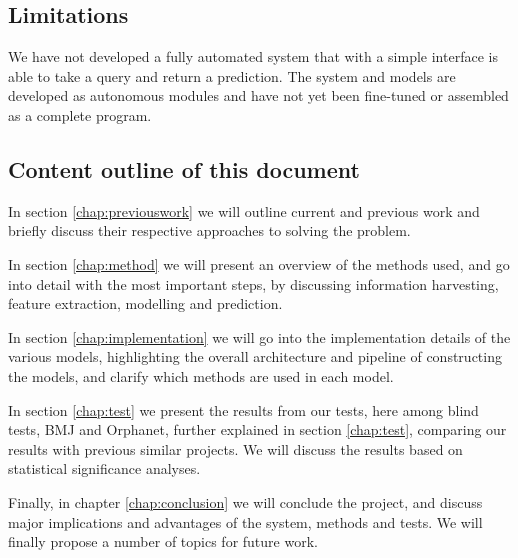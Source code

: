 \documentclass[10pt,letterpaper,final]{article}
\begin{document}



\subsection{Limitations}
We have not developed a fully automated system that with a simple
interface is able to take a query and return a prediction. The system
and models are developed as autonomous modules and have not yet been
fine-tuned or assembled as a complete program.


\subsection{Content outline of this document}
In section \ref{chap:previouswork} we will outline current and previous
work and briefly discuss their respective approaches to solving the
problem.

In section \ref{chap:method} we will present an overview of the methods
used, and go into detail with the most important steps, by discussing
information harvesting, feature extraction, modelling and prediction.


In section \ref{chap:implementation} we will go into the implementation
details of the various models, highlighting the overall architecture and
pipeline of constructing the models, and clarify which methods are used
in each model.


In section \ref{chap:test} we present the results from our tests, here
among blind tests, BMJ and Orphanet, further explained in section
\ref{chap:test}, comparing our results with previous similar projects.
We will discuss the results based on statistical significance
analyses.

Finally, in chapter \ref{chap:conclusion} we will conclude the project,
and discuss major implications and advantages of the system, methods and
tests. We will finally propose a number of topics for future work.


\end{document}
